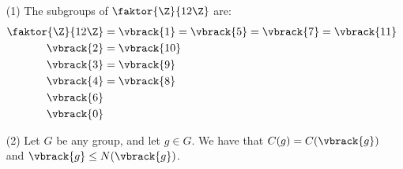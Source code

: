 \begin{example}
    \begin{enumerate}
        \item[(1)] The subgroups of $\faktor{\Z}{12\Z}$ are:
            \begin{align*}
                \faktor{\Z}{12\Z} &= \vbrack{1}=\vbrack{5}=\vbrack{7}=\vbrack{11} \\
                \vbrack{2}        &= \vbrack{10}    \\
                \vbrack{3}        &= \vbrack{9}     \\
                \vbrack{4}        &= \vbrack{8}     \\
                \vbrack{6}                          \\
                \vbrack{0}                          \\
            \end{align*}

        \item[(2)] Let $G$ be any group, and let  $g \in G$. We have that
            $C(g)=C(\vbrack{g})$ and $\vbrack{g} \leq N(\vbrack{g})$.
    \end{enumerate}
\end{example}
